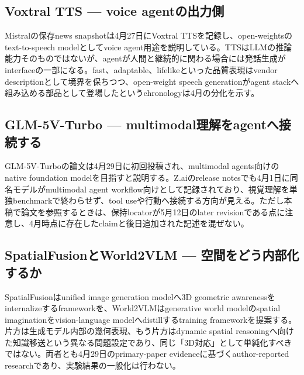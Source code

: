 \begingroup\raggedright
\subsection{Voxtral TTS — voice agentの出力側}
\par\endgroup

Mistralの保存news snapshotは4月27日にVoxtral TTSを記録し、open-weightsのtext-to-speech modelとしてvoice agent用途を説明している。TTSはLLMの推論能力そのものではないが、agentが人間と継続的に関わる場合には発話生成がinterfaceの一部になる。fast、adaptable、lifelikeといった品質表現はvendor descriptionとして境界を保ちつつ、open-weight speech generationがagent stackへ組み込める部品として登場したというchronologyは4月の分化を示す。\autocite{src-d8b7c1c36830}


\begingroup\raggedright
\subsection{GLM-5V-Turbo — multimodal理解をagentへ接続する}
\par\endgroup

GLM-5V-Turboの論文は4月29日に初回投稿され、multimodal agents向けのnative foundation modelを目指すと説明する。Z.aiのrelease notesでも4月1日に同名モデルがmultimodal agent workflow向けとして記録されており、視覚理解を単独benchmarkで終わらせず、tool useや行動へ接続する方向が見える。ただし本稿で論文を参照するときは、保持locatorが5月12日のlater revisionである点に注意し、4月時点に存在したclaimと後日追加された記述を混ぜない。\autocite{src-d113b486a585}


\begingroup\raggedright
\subsection{SpatialFusionとWorld2VLM — 空間をどう内部化するか}
\par\endgroup

SpatialFusionはunified image generation modelへ3D geometric awarenessをinternalizeするframeworkを、World2VLMはgenerative world modelのspatial imaginationをvision-language modelへdistillするtraining frameworkを提案する。片方は生成モデル内部の幾何表現、もう片方はdynamic spatial reasoningへ向けた知識移送という異なる問題設定であり、同じ「3D対応」として単純化すべきではない。両者とも4月29日のprimary-paper evidenceに基づくauthor-reported researchであり、実験結果の一般化は行わない。\autocite{src-3fa7f7c1140f,src-fec81b98fdc8}


